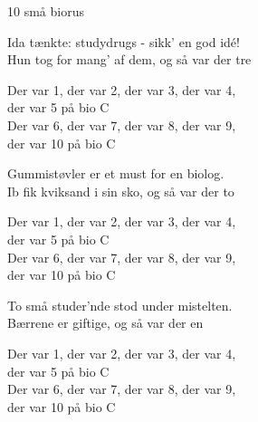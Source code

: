 \begin{song}{10 små biorus}{}
  \begin{SBVerse}
  Ida tænkte: studydrugs - sikk’ en god idé!\\
  Hun tog for mang' af dem, og så var der tre
  \end{SBVerse}

  \begin{SBChorus}
  Der var 1, der var 2, der var 3, der var 4,\\
  der var 5 på bio C\\
  Der var 6, der var 7, der var 8, der var 9,\\
  der var 10 på bio C
  \end{SBChorus}


  \begin{SBVerse}
  Gummistøvler er et must for en biolog.\\
  Ib fik kviksand i sin sko, og så var der to
  \end{SBVerse}

  \begin{SBChorus}
  Der var 1, der var 2, der var 3, der var 4,\\
  der var 5 på bio C\\
  Der var 6, der var 7, der var 8, der var 9,\\
  der var 10 på bio C
  \end{SBChorus}


  \begin{SBVerse}
  To små studer'nde stod under mistelten.\\
  Bærrene er giftige, og så var der en
  \end{SBVerse}

  \begin{SBChorus}
  Der var 1, der var 2, der var 3, der var 4,\\
  der var 5 på bio C\\
  Der var 6, der var 7, der var 8, der var 9,\\
  der var 10 på bio C
  \end{SBChorus}



\end{song}
